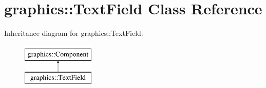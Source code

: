 \hypertarget{classgraphics_1_1_text_field}{\section{graphics\-:\-:Text\-Field Class Reference}
\label{classgraphics_1_1_text_field}
}
Inheritance diagram for graphics\-:\-:Text\-Field\-:\begin{figure}[H]
\begin{center}
\leavevmode
\includegraphics[height=2.000000cm]{classgraphics_1_1_text_field}
\end{center}
\end{figure}
